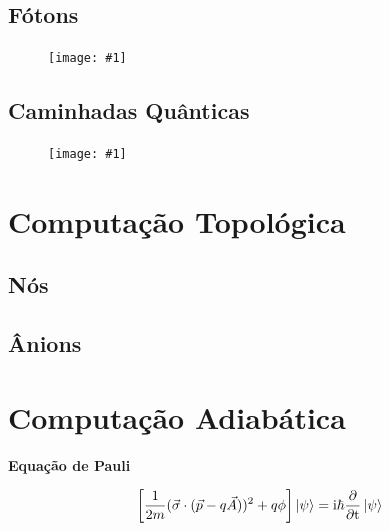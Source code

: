 \documentclass[t]{beamer}
\newcommand{\ii}{
	\rm{i}
}
\newcommand{\titulo}[1]{%
	\textbf{\Large #1\\}
}
\newcommand{\ket}[1]{\ensuremath{\left|#1\right\rangle}}
\newcommand{\imgw}[2]{%
\begin{center}
	\begin{figure}
	\texttt{[image: \#1]}\\
	\end{figure}
\end{center}
}
\begin{document}
	\subsection{Fótons}	
	
	\begin{frame}{\subsecname}
		\imgw{superposition.pdf}{\textwidth}
	\end{frame}
	
	\subsection{Caminhadas Quânticas}
	
	\begin{frame}{\subsecname}
		\imgw{superposition.pdf}{\textwidth}
	\end{frame}

	\section{Computação Topológica}
	
	\subsection{Nós}
	
	\begin{frame}{\subsecname}
	
	\end{frame}	
	
	\begin{frame}{\subsecname}
	
	\end{frame}
	
	\subsection{Ânions}
	
	\begin{frame}{\subsecname}
	
	\end{frame}	
	
	\begin{frame}{\subsecname}
	
	\end{frame}
	
	\section{Computação Adiabática}
	
	\begin{frame}{\secname}
	\titulo{Equação de Pauli}
	$$\left[{\frac {1}{2m}}({\vec {\sigma }}\cdot ({\vec {p}}-q{\vec {A}}))^{2}+q\phi \right]\ket{\psi} = \ii\hbar {\frac {\partial }{\partial t}}\ket{\psi}$$
	
	\end{frame}
	
\end{document}
